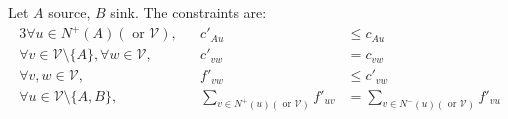Let $A$ source, $B$ sink. The constraints are:
\begin{alignat*}{3}
  \forall u \in N^{+}\left(A\right) \left(\mbox{ or } \mathcal{V}\right),&& c'_{Au} &\leq c_{Au} \\
  \forall v \in \mathcal{V} \setminus \{A\}, \forall w \in \mathcal{V},&&  c'_{vw} &= c_{vw} \\
  \forall v,w \in \mathcal{V},&&  f'_{vw} &\leq c'_{vw} \\
  \forall u \in \mathcal{V} \setminus \{A, B\},&&
  \sum\limits_{v \in N^{+}\left(u\right) \left(\mbox{ or } \mathcal{V}\right)}f'_{uv} &=
  \sum\limits_{v \in N^{-}\left(u\right) \left(\mbox{ or } \mathcal{V}\right)}f'_{vu}
\end{alignat*}
